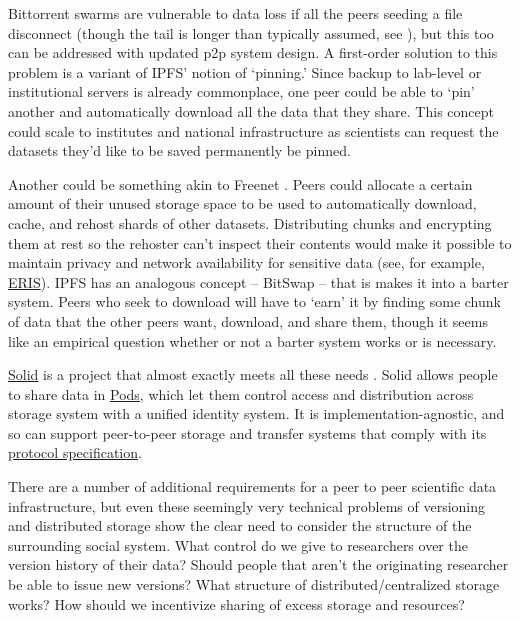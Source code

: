 \documentclass[10pt]{article}
\begin{document}
\begin{multicols}{2}
Bittorrent swarms are vulnerable to data loss if all the peers seeding a
file disconnect (though the tail is longer than typically assumed, see
\cite{zhangUnravelingBitTorrentEcosystem2011} ), but this too can
be addressed with updated p2p system design. A first-order solution to
this problem is a variant of IPFS' notion of `pinning.' Since backup to
lab-level or institutional servers is already commonplace, one peer
could be able to `pin' another and automatically download all the data
that they share. This concept could scale to institutes and national
infrastructure as scientists can request the datasets they'd like to be
saved permanently be pinned.

Another could be something akin to Freenet \cite{clarkeFreenetDistributedAnonymous2001} . Peers could allocate a
certain amount of their unused storage space to be used to automatically
download, cache, and rehost shards of other datasets. Distributing
chunks and encrypting them at rest so the rehoster can't inspect their
contents would make it possible to maintain privacy and network
availability for sensitive data (see, for example,
\href{https://inqlab.net/projects/eris/}{ERIS}). IPFS has an analogous
concept -- BitSwap -- that is makes it into a barter system. Peers who
seek to download will have to `earn' it by finding some chunk of data
that the other peers want, download, and share them, though it seems
like an empirical question whether or not a barter system works or is
necessary.

\href{https://solidproject.org/}{Solid} is a project that almost exactly
meets all these needs \cite{capadisliSolidProtocol2020, sambraSolidPlatformDecentralized2016, SolidP2PFoundation} . Solid
allows people to share data in
\href{https://solidproject.org/about}{Pods}, which let them control
access and distribution across storage system with a unified identity
system. It is implementation-agnostic, and so can support peer-to-peer
storage and transfer systems that comply with its
\href{https://solidproject.org/TR/protocol}{protocol specification}.

There are a number of additional requirements for a peer to peer
scientific data infrastructure, but even these seemingly very technical
problems of versioning and distributed storage show the clear need to
consider the structure of the surrounding social system. What control do
we give to researchers over the version history of their data? Should
people that aren't the originating researcher be able to issue new
versions? What structure of distributed/centralized storage works? How
should we incentivize sharing of excess storage and resources?


\end{multicols}
\end{document}
